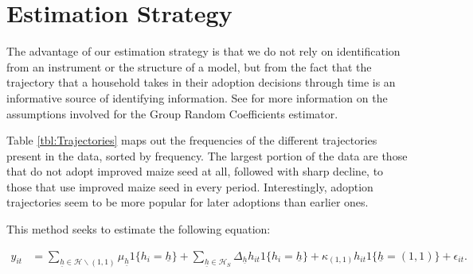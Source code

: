 \documentclass{article}
\begin{document}
\section{Estimation Strategy}

The advantage of our estimation strategy is that we do not rely on identification from an instrument or the structure of a model, but from the fact that the trajectory that a household takes in their adoption decisions through time is an informative source of identifying information. See \cite{Tjernstrom_Emilia_Dalia_Ghanem_Oscar_Barriga_Cabanillas_Travis_J_Lybbert_Jeffrey_D_Michler_and_Aleksandr_Michuda2020-bc} for more information on the assumptions involved for the Group Random Coefficients estimator. 

Table \ref{tbl:Trajectories} maps out the frequencies of the different trajectories present in the data, sorted by frequency. The largest portion of the data are those that do not adopt improved maize seed at all, followed with sharp decline, to those that use improved maize seed in every period. Interestingly, adoption trajectories seem to be more popular for later adoptions than earlier ones.





This method seeks to estimate the following equation:

\begin{align}
y_{it}&=\sum_{\underline{h}\in\mathcal{H}\backslash (1,1)}\mu_{\underline{h}}1\{h_{i}=\underline{h}\}+\sum_{\underline{h}\in\mathcal{H}_{S}}\Delta_{\underline{h}}h_{it}1\{h_{i}=\underline{h}\}+\kappa_{(1,1)}h_{it}1\{\underline{h}=(1,1)\}+\epsilon_{it}.\label{eq:GRC}
\end{align}
\end{document}
